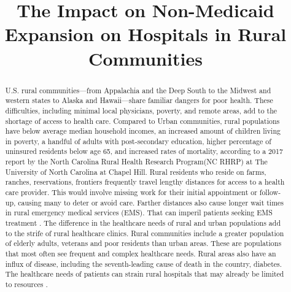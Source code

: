 \documentclass[10pt,conference]{IEEEtran}
\begin{document}
\title{The Impact on Non-Medicaid Expansion on Hospitals in Rural Communities}


\author{
\and
{}
\and
{}
}

\maketitle

\begin{abstract}
U.S. rural communities—from Appalachia and the Deep South to the Midwest and western states to Alaska and Hawaii—share familiar dangers for poor health. These difficulties, including minimal local physicians, poverty, and remote areas, add to the shortage of access to health care. Compared to Urban communities, rural populations have below average median household incomes, an increased amount of children living in poverty, a handful of adults with post-secondary education, higher percentage of uninsured residents below age 65, and increased rates of mortality, according to a 2017 report by the North Carolina Rural Health Research Program(NC RHRP) at The University of North Carolina at Chapel Hill. Rural residents who reside on farms, ranches, reservations, frontiers frequently travel lengthy distances for access to a health care provider. This would involve missing work for their initial appointment or follow-up, causing many to deter or avoid care. Farther distances also cause longer wait times in rural emergency medical services (EMS). That can imperil patients seeking EMS treatment \cite{aamcnews_2017}. The difference in the healthcare needs of rural and urban populations add to the strife of rural healthcare clinics. Rural communities include a greater population of elderly adults, veterans and poor residents than urban areas. These are populations that most often see frequent and complex healthcare needs. Rural areas also have an influx of disease, including the seventh-leading cause of death in the country, diabetes. The healthcare needs of patients can strain rural hospitals that may already be limited to resources \cite{dellasega}.
\end{abstract}
\end{document}

